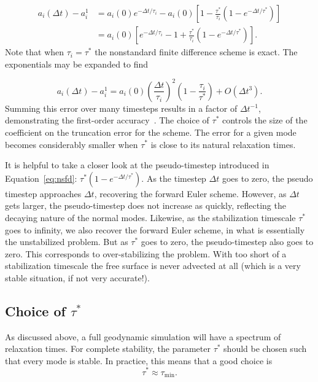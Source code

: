 \documentclass[preprint,12pt,authoryear]{elsarticle}
\newif\ifdetail
\begin{document}
\begin{equation}
\begin{aligned}
a_i(\Delta t) - a_i^{1} &= a_i(0) e^{-\Delta t/\tau_i} - a_i{(0)} \left[ 1 - \frac{\tau^*}{\tau_i} \left(1-e^{-\Delta t/\tau^*} \right) \right] \\
                        &= a_i{(0)} \left[ e^{-\Delta t/\tau_i} - 1 + \frac{\tau^*}{\tau_i} \left(1-e^{-\Delta t/\tau^*} \right) \right].
\end{aligned}
\end{equation}
Note that when $\tau_i = \tau^*$ the nonstandard finite difference scheme is exact.
The exponentials may be expanded to find
\ifdetail
\begin{equation}
a_i(\Delta t) - a_i^{1} = - a_i{(0)} \left[ \left(\frac{\Delta t}{\tau_i}\right)^2 - \frac{\tau^*}{\tau_i} \left(\frac{\Delta t }{\tau^* }\right)^2 \right].
\end{equation}
\fi
\begin{equation}
a_i(\Delta t) - a_i^{1} = {a_i{(0)} } \left( \frac{\Delta t}{\tau_i} \right)^2 \left( 1 - \frac{\tau_i}{\tau^*} \right) + O(\Delta t^3).
\end{equation}
Summing this error over many timesteps results in a factor of $\Delta t^{-1}$, demonstrating the first-order accuracy~\citep[e.g.][]{leveque2007finite}.
The choice of $\tau^*$ controls the size of the coefficient on the truncation error for the scheme.
The error for a given mode becomes considerably smaller when $\tau^*$ is close to its natural relaxation times.

It is helpful to take a closer look at the pseudo-timestep introduced in Equation~\eqref{eq:nsfd}: $\tau^*(1-e^{-\Delta t/\tau^*})$.
As the timestep $\Delta t$ goes to zero, the pseudo timestep approaches $\Delta t$, recovering 
the forward Euler scheme. However, as $\Delta t$ gets larger, the pseudo-timestep does not 
increase as quickly, reflecting the decaying nature of the normal modes.
Likewise, as the stabilization timescale $\tau^*$ goes to infinity, we also recover the 
forward Euler scheme, in what is essentially the unstabilized problem. But as $\tau^*$
goes to zero, the pseudo-timestep also goes to zero. This corresponds to over-stabilizing the
problem. With too short of a stabilization timescale the free surface is never advected 
at all (which is a very stable situation, if not very accurate!).

\subsection{Choice of $\tau^*$}
As discussed above, a full geodynamic simulation will have a spectrum of relaxation times.
For complete stability, the parameter $\tau^*$ should be chosen such that every mode is stable.
In practice, this means that a good choice is 
\begin{equation}
\tau^* \approx \tau_{\mathrm{min}}.
\label{eq:tau_choice}
\end{equation}
\end{document}
